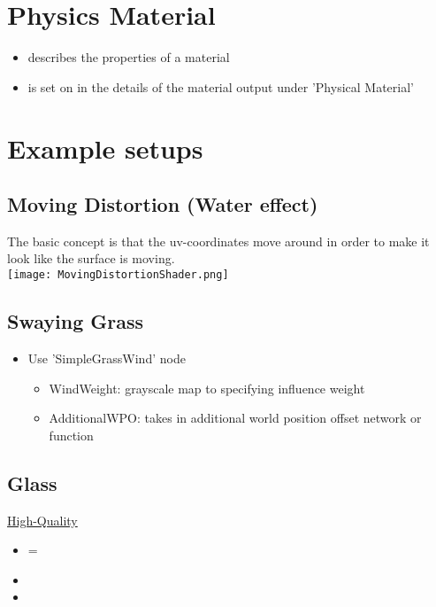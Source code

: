     \section{Physics Material}
        \begin{itemize}
            \item describes the properties of a material
            \item is set on in the details of the material output under 'Physical Material' 
        \end{itemize}

    \section{Example setups}
        \subsection{Moving Distortion (Water effect)}
            The basic concept is that the uv-coordinates move around
            in order to make it look like the surface is moving. \\
            \texttt{[image: MovingDistortionShader.png]} \\


        \subsection{Swaying Grass}
            \begin{itemize}
                \item Use 'SimpleGrassWind' node
                \begin{itemize}
                    \item WindWeight: grayscale map to specifying influence weight
                    \item AdditionalWPO: takes in additional world position offset network or function
                \end{itemize} 
            \end{itemize}


        \subsection{Glass}
            \uline{High-Quality}
            \begin{itemize}
                \item {} = 
                \item 
                \item 
            \end{itemize}

